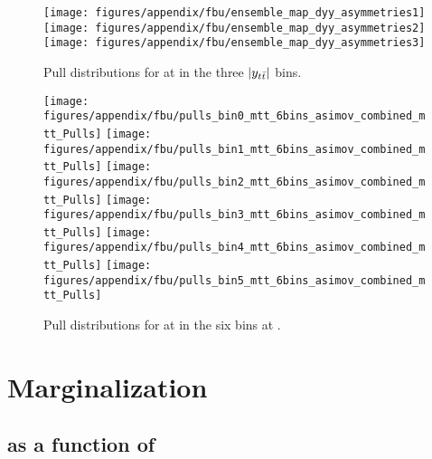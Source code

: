\begin{figure}
  \begin{center}
  \texttt{[image: figures/appendix/fbu/ensemble\_map\_dyy\_asymmetries1]}
  \texttt{[image: figures/appendix/fbu/ensemble\_map\_dyy\_asymmetries2]}
  \texttt{[image: figures/appendix/fbu/ensemble\_map\_dyy\_asymmetries3]}
  \caption{
    \label{fig:app:pulls_vs_y}
    Pull distributions for \ac{} at \seventev{} in the three $|y_{t\bar{t}}{}|$ bins.
  }
  \end{center}
\end{figure}

\begin{figure}
  \begin{center}
    \texttt{[image: figures/appendix/fbu/pulls\_bin0\_mtt\_6bins\_asimov\_combined\_mtt\_Pulls]}
    \texttt{[image: figures/appendix/fbu/pulls\_bin1\_mtt\_6bins\_asimov\_combined\_mtt\_Pulls]}
    \texttt{[image: figures/appendix/fbu/pulls\_bin2\_mtt\_6bins\_asimov\_combined\_mtt\_Pulls]}
    \texttt{[image: figures/appendix/fbu/pulls\_bin3\_mtt\_6bins\_asimov\_combined\_mtt\_Pulls]}
    \texttt{[image: figures/appendix/fbu/pulls\_bin4\_mtt\_6bins\_asimov\_combined\_mtt\_Pulls]}
    \texttt{[image: figures/appendix/fbu/pulls\_bin5\_mtt\_6bins\_asimov\_combined\_mtt\_Pulls]}
  \caption{
    \label{fig:app:pulls_vs_mass8tev}
    Pull distributions for \ac{} at \eighttev{} in the six \mtt{} bins at \eighttev{}.
  }
  \end{center}
\end{figure}

\section{Marginalization}
\label{app:unfolding:marginalization}

\subsection{\ac{} as a function of \mtt{}}

